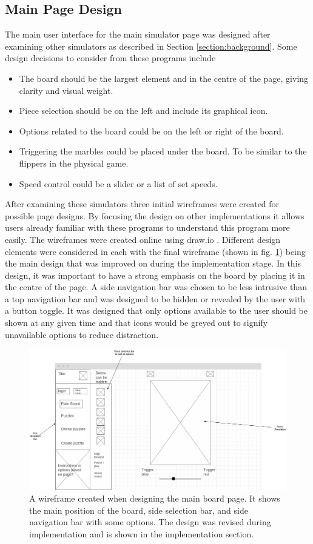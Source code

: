 \documentclass{l4proj}
\begin{document}
\subsection{Main Page Design}
The main user interface for the main simulator page was designed after examining other simulators as described in Section \ref{section:background}. Some design decisions to consider from these programs include
\begin{itemize}
    \item The board should be the largest element and in the centre of the page, giving clarity and visual weight.
    \item Piece selection should be on the left and include its graphical icon.
    \item Options related to the board could be on the left or right of the board.
    \item Triggering the marbles could be placed under the board. To be similar to the flippers in the physical game.
    \item Speed control could be a slider or a list of set speeds.
\end{itemize}

After examining these simulators three initial wireframes were created for possible page designs. By focusing the design on other implementations it allows users already familiar with these programs to understand this program more easily. The wireframes were created online using draw.io \citep{noauthor_flowchart_nodate}. Different design elements were considered in each with the final wireframe (shown in fig. \ref{fig:wireframe}) being the main design that was improved on during the implementation stage. In this design, it was important to have a strong emphasis on the board by placing it in the centre of the page. A side navigation bar was chosen to be less intrusive than a top navigation bar and was designed to be hidden or revealed by the user with a button toggle. It was designed that only options available to the user should be shown at any given time and that icons would be greyed out to signify unavailable options to reduce distraction.


\begin{figure}
    \centering
    \includegraphics[width=0.8\linewidth]{images/wireframe.png}
    \caption{A wireframe created when designing the main board page. It shows the main position of the board, side selection bar, and side navigation bar with some options. The design was revised during implementation and is shown in the implementation section.}
    \label{fig:wireframe}
\end{figure}
\end{document}
